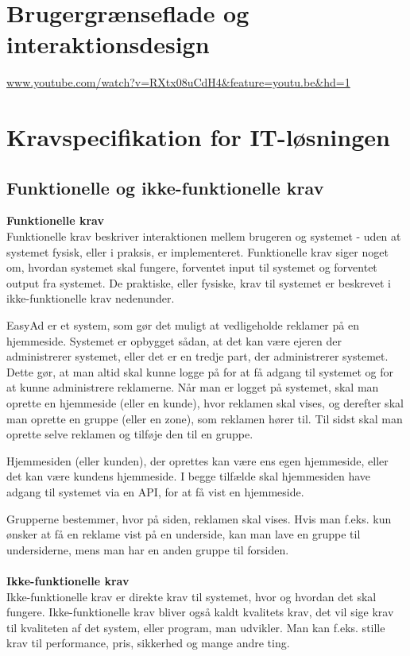 \documentclass[a4paper,12pt]{article}
\begin{document}
\section{Brugergrænseflade og interaktionsdesign}
\url{www.youtube.com/watch?v=RXtx08uCdH4&feature=youtu.be&hd=1}
\section{Kravspecifikation for IT-løsningen}
\subsection{Funktionelle og ikke-funktionelle krav}
\textbf{Funktionelle krav}
\\
Funktionelle krav beskriver interaktionen mellem brugeren og systemet - uden at systemet fysisk, eller i praksis, er implementeret. Funktionelle krav siger noget om, hvordan systemet skal fungere, forventet input til systemet og forventet output fra systemet. De praktiske, eller fysiske, krav til systemet er beskrevet i ikke-funktionelle krav nedenunder.

EasyAd er et system, som gør det muligt at vedligeholde reklamer på en hjemmeside. Systemet er opbygget sådan, at det kan være ejeren der administrerer systemet, eller det er en tredje part, der administrerer systemet. Dette gør, at man altid skal kunne logge på for at få adgang til systemet og for at kunne administrere reklamerne. Når man er logget på systemet, skal man oprette en hjemmeside (eller en kunde), hvor reklamen skal vises, og derefter skal man oprette en gruppe (eller en zone), som reklamen hører til. Til sidst skal man oprette selve reklamen og tilføje den til en gruppe.

Hjemmesiden (eller kunden), der oprettes kan være ens egen hjemmeside, eller det kan være kundens hjemmeside. I begge tilfælde skal hjemmesiden have adgang til systemet via en API, for at få vist en hjemmeside.

Grupperne bestemmer, hvor på siden, reklamen skal vises. Hvis man f.eks. kun ønsker at få en reklame vist på en underside, kan man lave en gruppe til undersiderne, mens man har en anden gruppe til forsiden.
\\
\\
\textbf{Ikke-funktionelle krav}
\\
Ikke-funktionelle krav er direkte krav til systemet, hvor og hvordan det skal fungere. Ikke-funktionelle krav bliver også kaldt kvalitets krav, det vil sige krav til kvaliteten af det system, eller program, man udvikler. Man kan f.eks. stille krav til performance, pris, sikkerhed og mange andre ting. 
\end{document}
